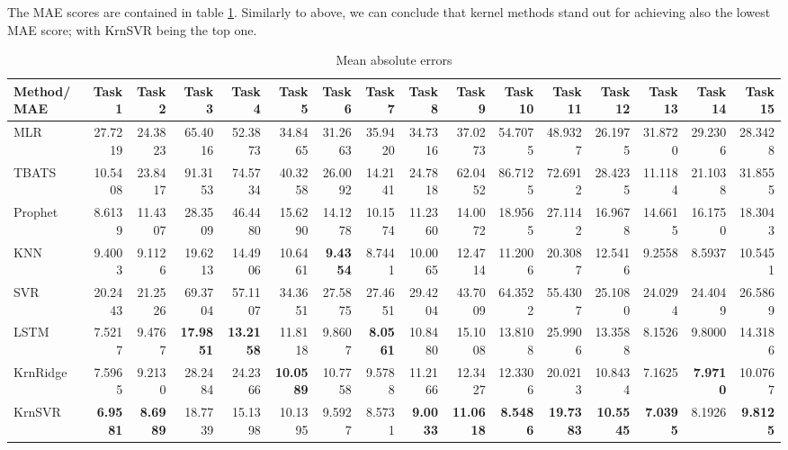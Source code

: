 The MAE scores are contained in table \ref{tab:point_MAE}. Similarly to above, we can conclude that kernel methods stand out for achieving also the lowest MAE score; with KrnSVR being the top one.
\begin{table}[!ht]
    \caption{Mean absolute errors}
    \label{tab:point_MAE}
    \begin{adjustbox}{width=\textwidth}
        \begin{tabular}{lrrrrrrrrrrrrrrr}
            \toprule
             Method/MAE & Task 1 & Task 2 & Task 3 & Task 4 & Task 5 & Task 6 & Task 7 & Task 8 & Task 9 & Task 10 & Task 11 & Task 12 & Task 13 & Task 14 & Task 15 \\
            \midrule
            MLR & 27.7219 & 24.3823 & 65.4016 & 52.3873 & 34.8465 & 31.2663 & 35.9420 & 34.7316 & 37.0273 & 54.7075 & 48.9327 & 26.1975 & 31.8720 & 29.2306 & 28.3428 \\
            TBATS & 10.5408 & 23.8417 & 91.3153 & 74.5734 & 40.3258 & 26.0092 & 14.2141 & 24.7818 & 62.0452 & 86.7125 & 72.6912 & 28.4235 & 11.1184 & 21.1038 & 31.8555 \\
            Prophet & 8.6139 & 11.4307 & 28.3509 & 46.4480 & 15.6290 & 14.1278 & 10.1574 & 11.2360 & 14.0072 & 18.9565 & 27.1142 & 16.9678 & 14.6615 & 16.1750 & 18.3043 \\
            KNN & 9.4003 & 9.1126 & 19.6213 & 14.4906 & 10.6461 & \textbf{9.4354} & 8.7441 & 10.0065 & 12.4714 & 11.2006 & 20.3087 & 12.5416 & 9.2558 & 8.5937 & 10.5451 \\
            SVR & 20.2443 & 21.2526 & 69.3704 & 57.1107 & 34.3651 & 27.5875 & 27.4651 & 29.4204 & 43.7009 & 64.3522 & 55.4307 & 25.1080 & 24.0294 & 24.4049 & 26.5869 \\
            LSTM & 7.5217 & 9.4767 & \textbf{17.9851} & \textbf{13.2158} & 11.8118 & 9.8607 & \textbf{8.0561} & 10.8480 & 15.1008 & 13.8108 & 25.9906 & 13.3588 & 8.1526 & 9.8000 & 14.3186 \\
            KrnRidge & 7.5965 & 9.2130 & 28.2484 & 24.2366 & \textbf{10.0589} & 10.7758 & 9.5788 & 11.2166 & 12.3427 & 12.3306 & 20.0213 & 10.8434 & 7.1625 & \textbf{7.9710} & 10.0767 \\
            KrnSVR & \textbf{6.9581} & \textbf{8.6989} & 18.7739 & 15.1398 & 10.1395 & 9.5927 & 8.5731 & \textbf{9.0033} & \textbf{11.0618} & \textbf{8.5486} & \textbf{19.7383} & \textbf{10.5545} & \textbf{7.0395} & 8.1926 & \textbf{9.8125} \\
            \bottomrule
            \end{tabular}            
    \end{adjustbox}            
\end{table}

